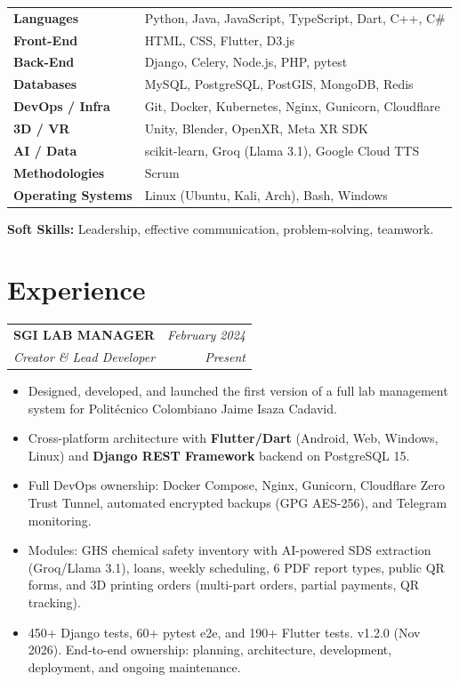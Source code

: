 \documentclass[11pt, a4paper]{article}
\makeatletter
\newcommand{\expentry}[4]{%
  \noindent
  \begin{tabularx}{\textwidth}{@{}X r@{}}
    \textbf{\color{primary}#1} & \textit{\small\color{darkgray}#3} \\
    \textit{\color{accent}#2}  & \textit{\small\color{darkgray}#4} \\
  \end{tabularx}%
}
\makeatother
\begin{document}
\begin{tabularx}{\textwidth}{@{} >{\bfseries\color{darkgray}}l X @{}}
Languages            & Python, Java, JavaScript, TypeScript, Dart, C++, C\# \\[2pt]
Front-End            & HTML, CSS, Flutter, D3.js \\[2pt]
Back-End             & Django, Celery, Node.js, PHP, pytest \\[2pt]
Databases            & MySQL, PostgreSQL, PostGIS, MongoDB, Redis \\[2pt]
DevOps / Infra       & Git, Docker, Kubernetes, Nginx, Gunicorn, Cloudflare \\[2pt]
3D / VR              & Unity, Blender, OpenXR, Meta XR SDK \\[2pt]
AI / Data            & scikit-learn, Groq (Llama 3.1), Google Cloud TTS \\[2pt]
Methodologies        & Scrum \\[2pt]
Operating Systems    & Linux (Ubuntu, Kali, Arch), Bash, Windows \\
\end{tabularx}

\medskip
\noindent\textbf{\color{darkgray}Soft Skills:}
Leadership, effective communication, problem-solving, teamwork.

\section{Experience}

\expentry{SGI LAB MANAGER}{Creator \& Lead Developer}{February 2024}{Present}

\begin{itemize}
  \item Designed, developed, and launched the first version of a full lab management
        system for Politécnico Colombiano Jaime Isaza Cadavid.
  \item Cross-platform architecture with \textbf{Flutter/Dart} (Android, Web, Windows, Linux)
        and \textbf{Django REST Framework} backend on PostgreSQL 15.
  \item Full DevOps ownership: Docker Compose, Nginx, Gunicorn, Cloudflare Zero Trust
        Tunnel, automated encrypted backups (GPG AES-256), and Telegram monitoring.
  \item Modules: GHS chemical safety inventory with AI-powered SDS extraction
        (Groq/Llama 3.1), loans, weekly scheduling, 6 PDF report types, public
        QR forms, and 3D printing orders (multi-part orders, partial payments, QR tracking).
  \item 450+ Django tests, 60+ pytest e2e, and 190+ Flutter tests. v1.2.0 (Nov 2026).
        End-to-end ownership: planning, architecture, development, deployment, and
        ongoing maintenance.
\end{itemize}
\end{document}
